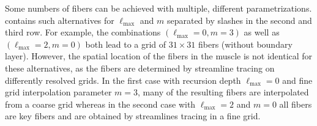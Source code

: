 Some numbers of fibers can be achieved with multiple, different parametrizations.  contains such alternatives for $\ell_\text{max}$ and $m$ separated by slashes in the second and third row. For example, the combinations $(\ell_\text{max} = 0, m=3)$ as well as $(\ell_\text{max} = 2, m=0)$ both lead to a grid of $31 \times 31$ fibers (without boundary layer). However, the spatial location of the fibers in the muscle is not identical for these alternatives, as the fibers are determined by streamline tracing on differently resolved grids.
In the first case with recursion depth $\ell_\text{max} = 0$ and fine grid interpolation parameter $m=3$, many of the resulting fibers are interpolated from a coarse grid whereas in the second case with $\ell_\text{max} = 2$ and $m=0$ all fibers are key fibers and are obtained by  streamlines tracing in a fine grid.


